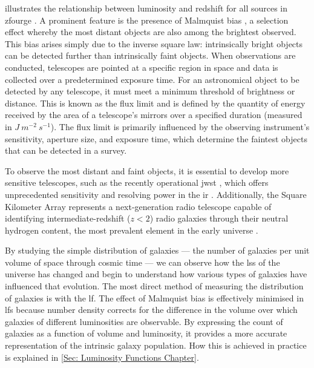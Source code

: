  illustrates the relationship between luminosity and redshift for all sources in \gls{zfourge} \citep{straatman_fourstar_2016}. A prominent feature is the presence of Malmquist bias \citep{malmquist_relations_1922}, a selection effect whereby the most distant objects are also among the brightest observed. This bias arises simply due to the inverse square law: intrinsically bright objects can be detected further than intrinsically faint objects. When observations are conducted, telescopes are pointed at a specific region in space and data is collected over a predetermined exposure time. For an astronomical object to be detected by any telescope, it must meet a minimum threshold of brightness or distance. This is known as the flux limit and is defined by the quantity of energy received by the area of a telescope's mirrors over a specified duration (measured in $J \ m^{-2} \ s^{-1}$). The flux limit is primarily influenced by the observing instrument's sensitivity, aperture size, and exposure time, which determine the faintest objects that can be detected in a survey.

To observe the most distant and faint objects, it is essential to develop more sensitive telescopes, such as the recently operational \gls{jwst} \citep{gardner_james_2006}, which offers unprecedented sensitivity and resolving power in the \gls{ir} \citep{labiano_wavelength_2021}. Additionally, the Square Kilometer Array \citep{dewdney_square_2009} represents a next-generation radio telescope capable of identifying intermediate-redshift ($z<2$) radio galaxies through their neutral hydrogen content, the most prevalent element in the early universe \citep{furlanetto_cosmology_2006}.

By studying the simple distribution of galaxies --- the number of galaxies per unit volume of space through cosmic time --- we can observe how the \gls{lss} of the universe has changed and begin to understand how various types of galaxies have influenced that evolution. The most direct method of measuring the distribution of galaxies is with the \gls{lf}. The effect of Malmquist bias is effectively minimised in \gls{lf}s because number density corrects for the difference in the volume over which galaxies of different luminosities are observable. By expressing the count of galaxies as a function of volume and luminosity, it provides a more accurate representation of the intrinsic galaxy population. How this is achieved in practice is explained in \cref{Sec: Luminosity Functions Chapter}.